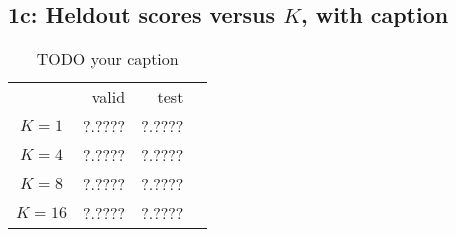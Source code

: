 \documentclass[11pt]{article}
\begin{document}
\newpage 
 \subsection{1c: Heldout scores versus $K$, with caption}

\begin{table}[!h]
{\Large 
\begin{tabular}{c r r r}
          & valid  & test
          \\
    $K=1$ & ?.???? & ?.????
\\
    $K=4$ & ?.???? & ?.????
\\
    $K=8$ & ?.???? & ?.????
\\
    $K=16$ & ?.???? & ?.????
\end{tabular}
}
\caption{
TODO your caption
}%
\end{table}
\end{document}
